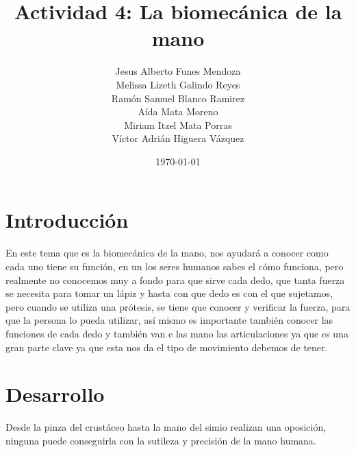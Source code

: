 \documentclass{article}
\author{Jesus Alberto Funes Mendoza  \\
Melissa Lizeth Galindo Reyes  \\
Ramón Samuel Blanco Ramirez  \\
Aída Mata Moreno  \\
Miriam Itzel Mata Porras  \\ 
Víctor Adrián Higuera Vázquez} %
\title{Actividad 4: La biomecánica de la mano} %
\date{\today}
\begin{document}

\maketitle %

\begin{abstract} %

\end{abstract}

\section{Introducción}\label{intro} %
En este tema que es la biomecánica de la mano, nos ayudará a conocer como cada uno tiene su función, en un los seres humanos sabes el cómo funciona, pero realmente no conocemos muy a fondo para que sirve cada dedo, que tanta fuerza se necesita para tomar un lápiz y hasta con que dedo es con el que sujetamos, pero cuando se utiliza una prótesis, se tiene que conocer y verificar la fuerza, para que la persona lo pueda utilizar, así mismo es importante también conocer las funciones de cada dedo y también van e las mano las articulaciones ya que es una gran parte clave ya que esta nos da el tipo de movimiento debemos de tener.

\section{Desarrollo}
Desde la pinza del crustáceo hasta la mano del simio realizan una oposición, ninguna puede conseguirla con la sutileza y precisión de la mano humana.
\end{document}
